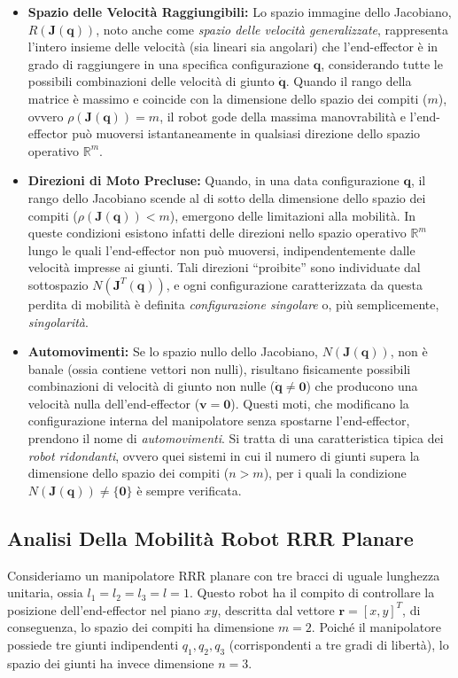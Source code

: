 \documentclass[11pt, a4paper]{report}
\begin{document}
\begin{itemize}
    \item \textbf{Spazio delle Velocità Raggiungibili:} Lo spazio immagine dello Jacobiano, $R(\bm{J}(\bm{q}))$, noto anche come \textit{spazio delle velocità generalizzate}, rappresenta l'intero insieme delle velocità (sia lineari sia angolari) che l'end-effector è in grado di raggiungere in una specifica configurazione $\bm{q}$, considerando tutte le possibili combinazioni delle velocità di giunto $\dot{\bm{q}}$. Quando il rango della matrice è massimo e coincide con la dimensione dello spazio dei compiti ($m$), ovvero $\rho(\bm{J}(\bm{q})) = m$, il robot gode della massima manovrabilità e l'end-effector può muoversi istantaneamente in qualsiasi direzione dello spazio operativo $\mathbb{R}^{m}$.

    \item \textbf{Direzioni di Moto Precluse:} Quando, in una data configurazione $\bm{q}$, il rango dello Jacobiano scende al di sotto della dimensione dello spazio dei compiti ($\rho(\bm{J}(\bm{q})) < m$), emergono delle limitazioni alla mobilità. In queste condizioni esistono infatti delle direzioni nello spazio operativo $\mathbb{R}^{m}$ lungo le quali l'end-effector non può muoversi, indipendentemente dalle velocità impresse ai giunti. Tali direzioni ``proibite'' sono individuate dal sottospazio $N(\bm{J}^T(\bm{q}))$, e ogni configurazione caratterizzata da questa perdita di mobilità è definita \textit{configurazione singolare} o, più semplicemente, \textit{singolarità}.

    \item \textbf{Automovimenti:} Se lo spazio nullo dello Jacobiano, $N(\bm{J}(\bm{q}))$, non è banale (ossia contiene vettori non nulli), risultano fisicamente possibili combinazioni di velocità di giunto non nulle ($\dot{\bm{q}} \neq \bm{0}$) che producono una velocità nulla dell'end-effector ($\bm{v} = \bm{0}$). Questi moti, che modificano la configurazione interna del manipolatore senza spostarne l'end-effector, prendono il nome di \textit{automovimenti}. Si tratta di una caratteristica tipica dei \textit{robot ridondanti}, ovvero quei sistemi in cui il numero di giunti supera la dimensione dello spazio dei compiti ($n > m$), per i quali la condizione $N(\bm{J}(\bm{q})) \neq \{\bm{0}\}$ è sempre verificata.
\end{itemize}

\newpage
\subsection{Analisi Della Mobilità Robot RRR Planare}
Consideriamo un manipolatore RRR planare con tre bracci di uguale lunghezza unitaria, ossia $l_1 = l_2 = l_3 = l = 1$. Questo robot ha il compito di controllare la posizione dell'end-effector nel piano $xy$, descritta dal vettore $\bm{r} = [x, y]^T$, di conseguenza, lo spazio dei compiti ha dimensione $m = 2$. Poiché il manipolatore possiede tre giunti indipendenti $q_1, q_2, q_3$ (corrispondenti a tre gradi di libertà), lo spazio dei giunti ha invece dimensione $n = 3$.
\end{document}
